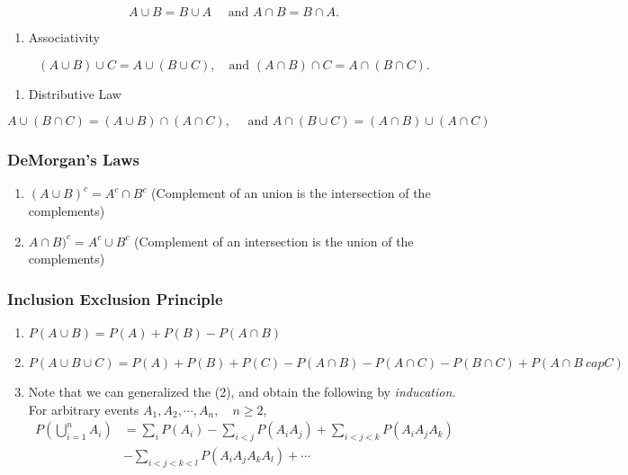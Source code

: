 \documentclass[
]{book}
\providecommand{\tightlist}{%
  \setlength{\itemsep}{0pt}\setlength{\parskip}{0pt}}
\theoremstyle{definition}
\theoremstyle{definition}
\theoremstyle{definition}
\theoremstyle{definition}
\theoremstyle{remark}
\begin{document}
\[
  A\cup B = B\cup A \quad \text{ and } A\cap B = B\cap A.
\]

\begin{enumerate}
\def\labelenumi{\arabic{enumi}.}
\setcounter{enumi}{1}
\tightlist
\item
  Associativity
\end{enumerate}

\[
  (A\cup B)\cup C = A \cup (B\cup C), \quad \text{and } (A\cap B)\cap C =  A \cap (B \cap C).
\]

\begin{enumerate}
\def\labelenumi{\arabic{enumi}.}
\setcounter{enumi}{2}
\tightlist
\item
  Distributive Law
\end{enumerate}

\[
  A\cup (B\cap C) = (A \cup B) \cap (A \cap  C) , \quad \text{ and } A \cap (B\cup C) =  (A\cap B) \cup (A\cap C)
\]

\hypertarget{demorgans-laws}{%
\subsubsection{DeMorgan's Laws}\label{demorgans-laws}}

\begin{enumerate}
\def\labelenumi{\arabic{enumi}.}
\item
  \((A\cup B)^c = A^c \cap B^c\) (Complement of an union is the intersection of the complements)
\item
  \(A\cap B)^c = A^c \cup B^c\) (Complement of an intersection is the union of the complements)
\end{enumerate}

\hypertarget{inclusion-exclusion-principle}{%
\subsubsection{Inclusion Exclusion Principle}\label{inclusion-exclusion-principle}}

\begin{enumerate}
\def\labelenumi{\arabic{enumi}.}
\item
  \(P(A\cup B ) = P(A) + P(B) - P(A\cap B)\)
\item
  \(P(A\cup B \cup C) = P(A) + P(B) + P(C) - P(A\cap B) - P(A \cap C) - P(B \cap C) + P(A\cap B \ cap C)\)
\item
  Note that we can generalized the (2), and obtain the following by \emph{inducation.} For arbitrary events \(A_1,A_2,\cdots,A_n,\quad n\ge 2\),
  \begin{align*}
  P(\bigcup_{i=1}^n A_i)  &  =\sum_{i}P(A_{i}%
  )-\sum_{i<j}P(A_{i}A_{j})+\sum_{i<j<k}P(A_{i}A_{j}A_{k})\\
  &  -\sum_{i<j<k<l}P(A_{i}A_{j}A_{k}A_{l})+\cdots
  \end{align*}
\end{enumerate}
\end{document}
